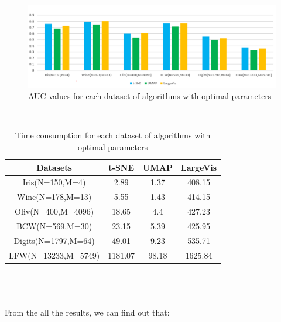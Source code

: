 \begin{figure}[ht]

\centering
\includegraphics[width=12cm,height=5cm\textwidth]{images/conclusion/AUC_result.PNG}
\caption{AUC values for each dataset of algorithms with optimal parameters}
\label{fig:label}
\end{figure}\\

\begin{table}[h]  %
\centering  %
 \begin{tabular}{|c|c|c|c|}  %
     \hline
       Datasets & t-SNE & UMAP & LargeVis\\
       [0.5ex]  %
      
        \hline  %
        Iris(N=150,M=4) & 2.89 & 1.37 & 408.15\\
        \hline  %
        Wine(N=178,M=13) & 5.55 & 1.43 & 414.15\\
        \hline  %
        Oliv(N=400,M=4096) & 18.65 & 4.4 & 427.23\\
        \hline  %
        BCW(N=569,M=30) & 23.15 & 5.39 & 425.95\\
        \hline  %
        Digits(N=1797,M=64) & 49.01 & 9.23 & 535.71\\
        \hline  %
        LFW(N=13233,M=5749) & 1181.07 & 98.18 & 1625.84\\
       \hline
   \end{tabular}
   \caption{Time consumption for each dataset of algorithms with optimal parameters} 
\end{table}\\
\\
\\
\noindent From the all the results, we can find out that:\\

